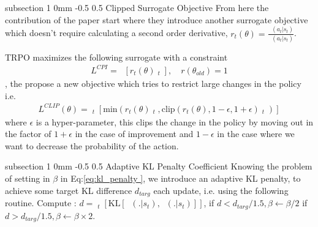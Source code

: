 \documentclass[twocolumn,11pt]{article}
\makeatletter
\DeclareMathOperator{\eE}{\hat{E}} %
\DeclareMathOperator{\pit}{\pi_\theta}
\DeclareMathOperator{\pito}{\pi_{\theta_{\text{old}}}}
\DeclareMathOperator{\eA}{\bar{A}} %
\renewcommand{\subsection}{\@startsection
{subsection}%
{1}%
{0mm}%
{-0.5\baselineskip}%
{0.5\baselineskip}%
{\bfseries\color{blue}}} %
\makeatother
\begin{document}
\subsection{Clipped Surrogate Objective}
From here the contribution of the paper start where they introduce another surrogate objective which doesn't require calculating a second order derivative, $r_t(\theta) = \tfrac{\pit(a_t|s_t)}{\pito(a_t | s_t)}$.

TRPO maximizes the following surrogate with a constraint \useshortskip
\begin{align*}
L^{CPI} = \eE \left[ r_t (\theta) \eA_t \right], \quad r(\theta_{old} ) = 1
\end{align*}, the propose a new objective which tries to restrict large changes in the policy i.e.  \useshortskip
\begin{align*}
L^{CLIP}  (\theta) = \eE_t \left[ \text{min} (  r_t(\theta) \eA_t,  \text{clip}(r_t(\theta), 1-\epsilon, 1 + \epsilon   ) \eA_t)\right]
\end{align*}
where $\epsilon$ is a hyper-parameter, this clips the  change in the policy by moving out in the factor of $1 + \epsilon$ in the case of improvement and $1 - \epsilon$ in the case where  we want to decrease the probability of the action.


\subsection{Adaptive KL Penalty Coefficient}
Knowing the problem of setting in $\beta $ in Eq:\ref{eq:kl_penalty }, we introduce an adaptive KL penalty, to achieve some target KL difference $d_{targ}$ each update, i.e. using the following routine. Compute : 
$d =  \eE_t \left[ \text{KL}[\pito (.| s_t), \pit (. | s_t)] \right]$, if $d < d_{targ} / 1.5 , \beta \leftarrow \beta/2$ if $d > d_{targ} / 1.5 , \beta \leftarrow \beta \times 2$.
\end{document}
